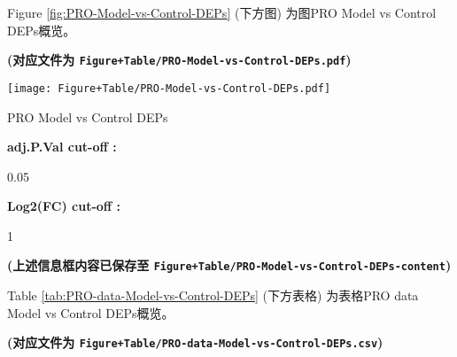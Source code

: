 \documentclass[
]{article}
\begin{document}
Figure \ref{fig:PRO-Model-vs-Control-DEPs} (下方图) 为图PRO Model vs Control DEPs概览。

\textbf{(对应文件为 \texttt{Figure+Table/PRO-Model-vs-Control-DEPs.pdf})}

\def\@captype{figure}
\begin{center}
\texttt{[image: Figure+Table/PRO-Model-vs-Control-DEPs.pdf]}
\caption{PRO Model vs Control DEPs}\label{fig:PRO-Model-vs-Control-DEPs}
\end{center}
\begin{center}\begin{tcolorbox}[colback=gray!10, colframe=gray!50, width=0.9\linewidth, arc=1mm, boxrule=0.5pt]
\textbf{
adj.P.Val cut-off
:}

\vspace{0.5em}

    0.05

\vspace{2em}


\textbf{
Log2(FC) cut-off
:}

\vspace{0.5em}

    1

\vspace{2em}
\end{tcolorbox}
\end{center}

\textbf{(上述信息框内容已保存至 \texttt{Figure+Table/PRO-Model-vs-Control-DEPs-content})}

Table \ref{tab:PRO-data-Model-vs-Control-DEPs} (下方表格) 为表格PRO data Model vs Control DEPs概览。

\textbf{(对应文件为 \texttt{Figure+Table/PRO-data-Model-vs-Control-DEPs.csv})}
\end{document}
